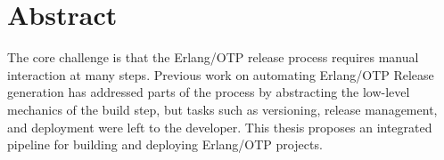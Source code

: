\cleardoublepage{}

\chapter*{Abstract}

The core challenge is that the Erlang/OTP release process requires manual interaction at many steps.
Previous work on automating Erlang/OTP Release generation has addressed parts of the process by abstracting the low-level mechanics of the build step, but tasks such as versioning, release management, and deployment were left to the developer.
This thesis proposes an integrated pipeline for building and deploying Erlang/OTP projects.
